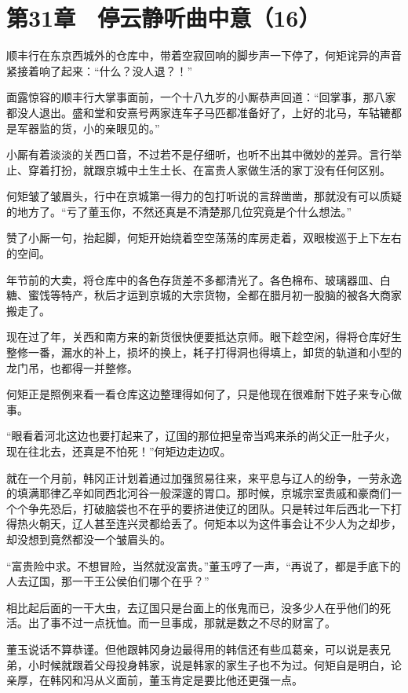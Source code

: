 \section{第31章　停云静听曲中意（16）}

顺丰行在东京西城外的仓库中，带着空寂回响的脚步声一下停了，何矩诧异的声音紧接着响了起来：“什么？没人退？！”

面露惊容的顺丰行大掌事面前，一个十八九岁的小厮恭声回道：“回掌事，那八家都没人退出。盛和堂和安熹号两家连车子马匹都准备好了，上好的北马，车轱辘都是军器监的货，小的亲眼见的。”

小厮有着淡淡的关西口音，不过若不是仔细听，也听不出其中微妙的差异。言行举止、穿着打扮，就跟京城中土生土长、在富贵人家做生活的家丁没有任何区别。

何矩皱了皱眉头，行中在京城第一得力的包打听说的言辞凿凿，那就没有可以质疑的地方了。“亏了董玉你，不然还真是不清楚那几位究竟是个什么想法。”

赞了小厮一句，抬起脚，何矩开始绕着空空荡荡的库房走着，双眼梭巡于上下左右的空间。

年节前的大卖，将仓库中的各色存货差不多都清光了。各色棉布、玻璃器皿、白糖、蜜饯等特产，秋后才运到京城的大宗货物，全都在腊月初一股脑的被各大商家搬走了。

现在过了年，关西和南方来的新货很快便要抵达京师。眼下趁空闲，得将仓库好生整修一番，漏水的补上，损坏的换上，耗子打得洞也得填上，卸货的轨道和小型的龙门吊，也都得一并整修。

何矩正是照例来看一看仓库这边整理得如何了，只是他现在很难耐下姓子来专心做事。

“眼看着河北这边也要打起来了，辽国的那位把皇帝当鸡来杀的尚父正一肚子火，现在往北去，还真是不怕死！”何矩边走边叹。

就在一个月前，韩冈正计划着通过加强贸易往来，来平息与辽人的纷争，一劳永逸的填满耶律乙辛如同西北河谷一般深邃的胃口。那时候，京城宗室贵戚和豪商们一个个争先恐后，打破脑袋也不在乎的要挤进使辽的团队。只是转过年后西北一下打得热火朝天，辽人甚至连兴灵都给丢了。何矩本以为这件事会让不少人为之却步，却没想到竟然都没一个皱眉头的。

“富贵险中求。不想冒险，当然就没富贵。”董玉哼了一声，“再说了，都是手底下的人去辽国，那一干王公侯伯们哪个在乎？”

相比起后面的一干大虫，去辽国只是台面上的伥鬼而已，没多少人在乎他们的死活。出了事不过一点抚恤。而一旦事成，那就是数之不尽的财富了。

董玉说话不算恭谨。但他跟韩冈身边最得用的韩信还有些瓜葛亲，可以说是表兄弟，小时候就跟着父母投身韩家，说是韩家的家生子也不为过。何矩自是明白，论亲厚，在韩冈和冯从义面前，董玉肯定是要比他还更强一点。

